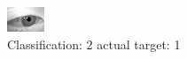 \begin{figure}[h!]
\begin{center}
\includegraphics[width=0.60\columnwidth]{figures/ID2743_class_2_target_1.png}
\end{center}
\caption{ Classification: 2 actual target: 1}
\label{fig:ID2743_class_2_target_1}
\end{figure}
